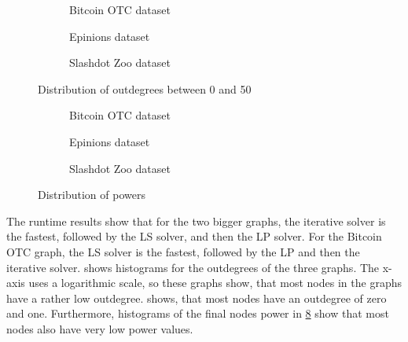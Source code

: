 \begin{figure}[t]
    \centering
        \begin{subfigure}[t]{0.30\textwidth}
        \caption{Bitcoin OTC dataset}
        \label{subfig:bitcoinotc_outdegrees}
    \end{subfigure}
    \hfill
        \begin{subfigure}[t]{0.30\textwidth}
        \caption{Epinions dataset}
        \label{subfig:epinions_outdegrees}
    \end{subfigure}
    \hfill
    \begin{subfigure}[t]{0.30\textwidth}
    	\centering
    	\caption{Slashdot Zoo dataset}
	\label{subfig:slashdot_outdegrees}
    \end{subfigure}
    \caption{Distribution of outdegrees between 0 and 50}
    \label{fig:datasets_outdegree_distr_50}
\end{figure}

\begin{figure}[t]
    \centering
        \begin{subfigure}[t]{0.30\textwidth}
        \caption{Bitcoin OTC dataset}
        \label{subfig:bitcoinotc_powers}
    \end{subfigure}
    \hfill
        \begin{subfigure}[t]{0.30\textwidth}
        \caption{Epinions dataset}
        \label{subfig:epinions_powers}
    \end{subfigure}
    \hfill
    \begin{subfigure}[t]{0.30\textwidth}
    	\centering
    	\caption{Slashdot Zoo dataset}
	\label{subfig:slashdot_powers}
    \end{subfigure}
    \caption{Distribution of powers}
    \label{fig:datasets_powers}
\end{figure}



The runtime results show that for the two bigger graphs, the iterative solver is the fastest, followed by the LS solver, and then the LP solver. For the Bitcoin OTC graph, the LS solver is the fastest, followed by the LP and then the iterative solver.  shows histograms for the outdegrees of the three graphs. The x-axis uses a logarithmic scale, so these graphs show, that most nodes in the graphs have a rather low outdegree.  shows, that most nodes have an outdegree of zero and one. Furthermore, histograms of the final nodes power in \cref{fig:datasets_powers} show that most nodes also have very low power values. 

